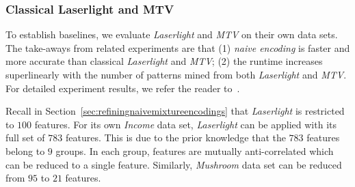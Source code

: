 
\subsubsection{Classical Laserlight and MTV}
\label{sec:classicallaserlightandmtv}

To establish baselines, we evaluate \textit{Laserlight} and \textit{MTV} on their own data sets.
The take-aways from related experiments are that (1) \textit{naive encoding} is faster and more accurate than classical \textit{Laserlight} and \textit{MTV}; (2) the runtime increases superlinearly with the number of patterns mined from both \textit{Laserlight} and \textit{MTV}.
For detailed experiment results, we refer the reader to~\cite{DBLP:journals/corr/abs-1809-00405}. 

Recall in Section~\ref{sec:refiningnaivemixtureencodings} that \textit{Laserlight} is restricted to $100$ features.
For its own \textit{Income} data set, \textit{Laserlight} can be applied with its full set of $783$ features.
This is due to the prior knowledge that the $783$ features belong to $9$ groups.
In each group, features are mutually anti-correlated which can be reduced to a single feature.
Similarly, \textit{Mushroom} data set can be reduced from $95$ to $21$ features.%

